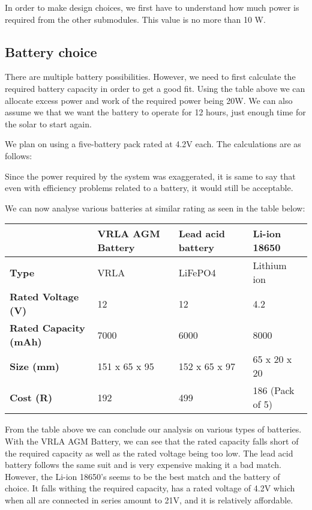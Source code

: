 \documentclass[class=report,11pt,crop=false]{standalone}
\begin{document}
In order to make design choices, we first have to understand how much power is required from the other submodules. This value is no more than 10 W.

\subsection{Battery choice}

There are multiple battery possibilities. However, we need to first calculate the required battery capacity in order to get a good fit. Using the table above we can allocate excess power and work of the required power being 20W. We can also assume we that we want the battery to operate for 12 hours, just enough time for the solar to start again.

We plan on using a five-battery pack rated at 4.2V each. The calculations are as follows:

Since the power required by the system was exaggerated, it is same to say that even with efficiency problems related to a battery, it would still be acceptable.

We can now analyse various batteries at similar rating as seen in the table below:

\begin{table}
\centering

\begin{tabular}{| l | l | l | l |}
\hline
  & \textbf{VRLA AGM Battery} & \textbf{Lead acid battery} & \textbf{Li-ion 18650} \\
\hline
\textbf{Type} & VRLA & LiFePO4  & Lithium ion \\
\hline
\textbf{Rated Voltage (V)} & 12 & 12 & 4.2 \\
\hline
\textbf{Rated Capacity (mAh)} & 7000 & 6000 & 8000 \\
\hline
\textbf{Size (mm)} & 151 x 65 x 95 & 152 x 65 x 97 & 65 x 20 x 20 \\
\hline
\textbf{Cost (R)} & 192 & 499 & 186 (Pack of 5) \\
\hline

\end{tabular}

\end{table}

 From the table above we can conclude our analysis on various types of batteries. With the VRLA AGM Battery, we can see that the rated capacity falls short of the required capacity as well as the rated voltage being too low. The lead acid battery follows the same suit and is very expensive making it a bad match. However, the Li-ion 18650’s seems to be the best match and the battery of choice. It falls withing the required capacity, has a rated voltage of 4.2V which when all are connected in series amount to 21V, and it is relatively affordable.
\end{document}
